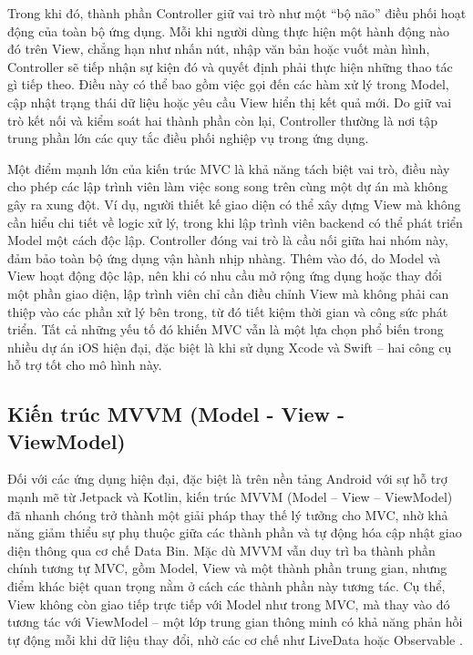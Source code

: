    
      \hspace*{0.8cm}Trong khi đó, thành phần Controller giữ vai trò như một “bộ não” điều phối hoạt động của toàn bộ ứng dụng. Mỗi khi người dùng thực hiện một hành động nào đó trên View, chẳng hạn như nhấn nút, nhập văn bản hoặc vuốt màn hình, Controller sẽ tiếp nhận sự kiện đó và quyết định phải thực hiện những thao tác gì tiếp theo. Điều này có thể bao gồm việc gọi đến các hàm xử lý trong Model, cập nhật trạng thái dữ liệu hoặc yêu cầu View hiển thị kết quả mới. Do giữ vai trò kết nối và kiểm soát hai thành phần còn lại, Controller thường là nơi tập trung phần lớn các quy tắc điều phối nghiệp vụ trong ứng dụng.
    \vspace{0.5em}

    
      \hspace*{0.8cm}Một điểm mạnh lớn của kiến trúc MVC là khả năng tách biệt vai trò, điều này cho phép các lập trình viên làm việc song song trên cùng một dự án mà không gây ra xung đột. Ví dụ, người thiết kế giao diện có thể xây dựng View mà không cần hiểu chi tiết về logic xử lý, trong khi lập trình viên backend có thể phát triển Model một cách độc lập. Controller đóng vai trò là cầu nối giữa hai nhóm này, đảm bảo toàn bộ ứng dụng vận hành nhịp nhàng. Thêm vào đó, do Model và View hoạt động độc lập, nên khi có nhu cầu mở rộng ứng dụng hoặc thay đổi một phần giao diện, lập trình viên chỉ cần điều chỉnh View mà không phải can thiệp vào các phần xử lý bên trong, từ đó tiết kiệm thời gian và công sức phát triển. Tất cả những yếu tố đó khiến MVC vẫn là một lựa chọn phổ biến trong nhiều dự án iOS hiện đại, đặc biệt là khi sử dụng Xcode và Swift – hai công cụ hỗ trợ tốt cho mô hình này.
    \vspace{0.5em}

\subsection{Kiến trúc MVVM (Model - View - ViewModel)}
\renewcommand{\labelitemi}{--}    
    
        \hspace*{0.8cm}Đối với các ứng dụng hiện đại, đặc biệt là trên nền tảng Android với sự hỗ trợ mạnh mẽ từ Jetpack và Kotlin, kiến trúc MVVM (Model – View – ViewModel) đã nhanh chóng trở thành một giải pháp thay thế lý tưởng cho MVC, nhờ khả năng giảm thiểu sự phụ thuộc giữa các thành phần và tự động hóa cập nhật giao diện thông qua cơ chế Data Bin. Mặc dù MVVM vẫn duy trì ba thành phần chính tương tự MVC, gồm Model, View và một thành phần trung gian, nhưng điểm khác biệt quan trọng nằm ở cách các thành phần này tương tác. Cụ thể, View không còn giao tiếp trực tiếp với Model như trong MVC, mà thay vào đó tương tác với ViewModel – một lớp trung gian thông minh có khả năng phản hồi tự động mỗi khi dữ liệu thay đổi, nhờ các cơ chế như LiveData hoặc Observable \cite{livedata-observable}.
    \vspace{0.5em}

